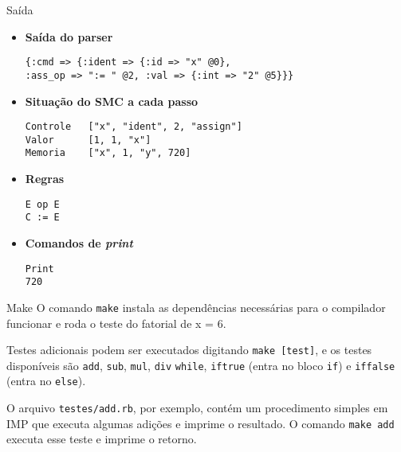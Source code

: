 \documentclass{beamer}
\begin{document}
\begin{frame}[fragile]{Saída}

\begin{itemize}
\item \textbf{Saída do parser}
\begin{verbatim}
{:cmd => {:ident => {:id => "x" @0},
:ass_op => ":= " @2, :val => {:int => "2" @5}}}
\end{verbatim}

\item \textbf{Situação do SMC a cada passo}
\begin{verbatim}
Controle   ["x", "ident", 2, "assign"]
Valor      [1, 1, "x"]
Memoria    ["x", 1, "y", 720]
\end{verbatim}

\item \textbf{Regras}
\begin{verbatim}
E op E
C := E
\end{verbatim}

\item \textbf{Comandos de \textit{print}}
\begin{verbatim}
Print
720
\end{verbatim}

\end{itemize}

\end{frame}

\begin{frame}[fragile]{Make}
O comando \verb|make| instala as dependências necessárias para o compilador funcionar e roda o teste do fatorial de x = 6.

Testes adicionais podem ser executados digitando \verb|make [test]|, e os testes disponíveis são \verb|add|, \verb|sub|, \verb|mul|, \verb|div| \verb|while|, \verb|iftrue| (entra no bloco \verb|if|) e \verb|iffalse| (entra no \verb|else|).

O arquivo \verb|testes/add.rb|, por exemplo, contém um procedimento simples em IMP que executa algumas adições e imprime o resultado. O comando \verb|make add| executa esse teste e imprime o retorno.

\end{frame}
\end{document}
